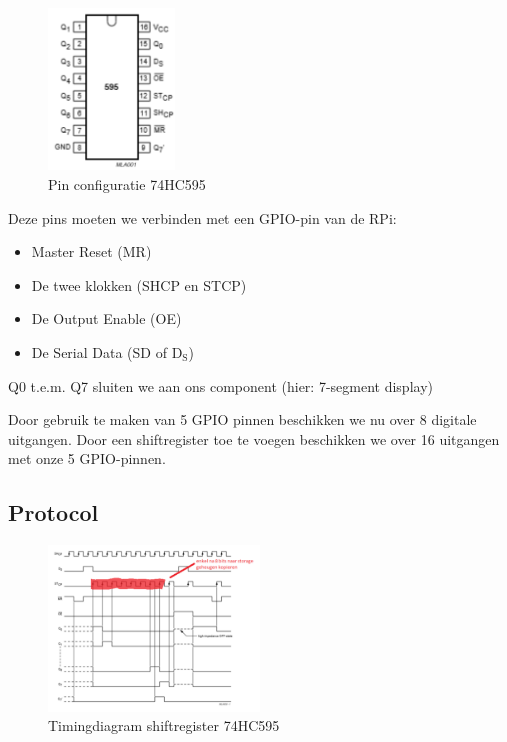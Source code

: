 \documentclass{article}
\begin{document}
\begin{figure}[H]
    \centering
    \includegraphics[width=0.3\textwidth]{shiftregister-pins.png}
    \caption{Pin configuratie 74HC595}
\end{figure}

Deze pins moeten we verbinden met een GPIO-pin van de RPi:
\begin{itemize}
    \item Master Reset (MR)
    \item De twee klokken (SHCP en STCP)
    \item De Output Enable (OE)
    \item De Serial Data (SD of $\text{D}_{\text{S}}$)
\end{itemize}

Q0 t.e.m. Q7 sluiten we aan ons component (hier: 7-segment display)

Door gebruik te maken van 5 GPIO pinnen beschikken we nu over 8 digitale uitgangen.
Door een shiftregister toe te voegen beschikken we over 16 uitgangen met onze 5 GPIO-pinnen.

\subsection{Protocol}

\begin{figure}[H]
    \centering
    \includegraphics[width=0.5\textwidth]{timing-shift.png}
    \caption{Timingdiagram shiftregister 74HC595}
\end{figure}
\end{document}
